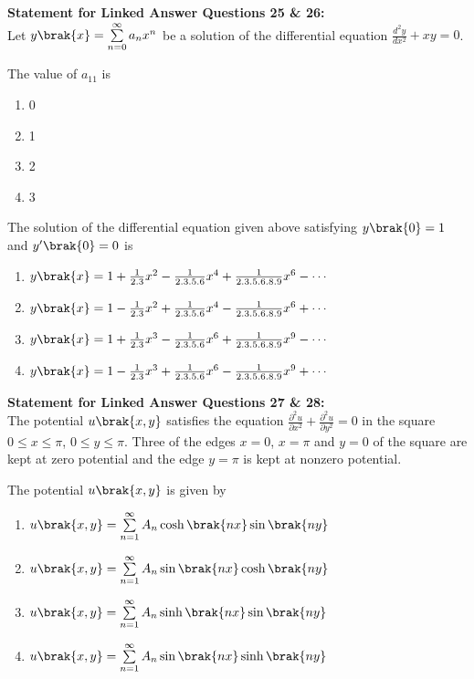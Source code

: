 \textbf{Statement for Linked Answer Questions 25 \& 26:} \\
Let $y\brak{x} = \sum\limits_{n=0}^{\infty}a_nx^n$ be a solution of the differential equation $\frac{d^2y}{dx^2} + xy = 0$.\\
\item The value of $a_{11}$ is
 \begin{enumerate}
     \item 0
     \item 1
     \item 2
     \item 3 \\
 \end{enumerate}
\item The solution of the differential equation given above satisfying $y\brak{0} = 1$ and $y'\brak{0} = 0$ is
\begin{enumerate}
     \item $y\brak{x} = 1 + \frac{1}{2.3}x^2 - \frac{1}{2.3.5.6}x^4 + \frac{1}{2.3.5.6.8.9}x^6 - \cdots$
     \item $y\brak{x} = 1 - \frac{1}{2.3}x^2 + \frac{1}{2.3.5.6}x^4 - \frac{1}{2.3.5.6.8.9}x^6 + \cdots$
     \item $y\brak{x} = 1 + \frac{1}{2.3}x^3 - \frac{1}{2.3.5.6}x^6 + \frac{1}{2.3.5.6.8.9}x^9 - \cdots$
     \item $y\brak{x} = 1 - \frac{1}{2.3}x^3 + \frac{1}{2.3.5.6}x^6 - \frac{1}{2.3.5.6.8.9}x^9 + \cdots$ \\
 \end{enumerate}
\textbf{Statement for Linked Answer Questions 27 \& 28:} \\
The potential $u\brak{x, y}$ satisfies the equation $\frac{\partial^2 u}{\partial x^2} + \frac{\partial^2 u}{\partial y^2} = 0$ in the square $0 \leq x \leq \pi$, $0 \leq y \leq \pi$. Three of the edges $x = 0$, $x = \pi$ and $y = 0$ of the square are kept at zero potential and the edge $y = \pi$ is kept at nonzero potential. \\
\item The potential $u\brak{x, y}$ is given by
\begin{enumerate}
    \item $u\brak{x, y} = \sum\limits_{n=1}^{\infty}A_n\cosh\brak{nx}\sin\brak{ny}$
    \item $u\brak{x, y} = \sum\limits_{n=1}^{\infty}A_n\sin\brak{nx}\cosh\brak{ny}$
    \item $u\brak{x, y} = \sum\limits_{n=1}^{\infty}A_n\sinh\brak{nx}\sin\brak{ny}$
    \item $u\brak{x, y} = \sum\limits_{n=1}^{\infty}A_n\sin\brak{nx}\sinh\brak{ny}$ \\
\end{enumerate}
